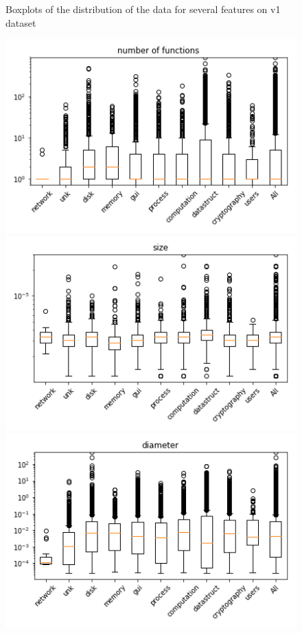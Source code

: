 \begin{appendices}
\begin{figure}[H]
\caption{Boxplots of the distribution of the data for several features on v1 dataset}\label{fig:distribution_analysis1}
\end{figure}




\begin{figure}[H]

%
\centering
\includegraphics[width=0.9\linewidth]{img/boxplots/v1_unbalanced_number_of_functions.png}
\endminipage
{}%
\centering
\includegraphics[width=0.9\linewidth]{img/boxplots/v1_unbalanced_size.png}
\endminipage
{}%
\centering
\includegraphics[width=0.9\linewidth]{img/boxplots/v1_unbalanced_diameter.png}
\endminipage


\end{figure}
\end{appendices}

